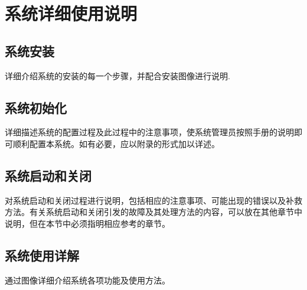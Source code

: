 \chapter{系统详细使用说明}

\section{系统安装}
详细介绍系统的安装的每一个步骤，并配合安装图像进行说明.

\section{系统初始化}
详细描述系统的配置过程及此过程中的注意事项，使系统管理员按照手册的说明即可顺利配置本系统。如有必要，应以附录的形式加以详述。

\section{系统启动和关闭}
对系统启动和关闭过程进行说明，包括相应的注意事项、可能出现的错误以及补救方法。有关系统启动和关闭引发的故障及其处理方法的内容，可以放在其他章节中说明，但在本节中必须指明相应参考的章节。

\section{系统使用详解}
通过图像详细介绍系统各项功能及使用方法。
